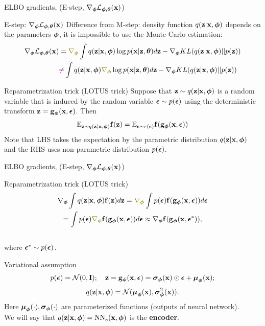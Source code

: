 \begin{frame}{ELBO gradients, (E-step, $\nabla_{\boldsymbol{\phi}} \mathcal{L}_{\boldsymbol{\phi}, \boldsymbol{\theta}}(\mathbf{x})$)}
	\begin{block}{E-step: $\nabla_{\boldsymbol{\phi}} \mathcal{L}_{\boldsymbol{\phi}, \boldsymbol{\theta}}(\mathbf{x})$}
		Difference from M-step: density function $q(\mathbf{z}| \mathbf{x}, \boldsymbol{\phi})$ depends on the parameters $\boldsymbol{\phi}$, it is impossible to use the Monte-Carlo estimation:
		\begin{align*}
			\nabla_{\bphi} \cL_{\bphi, \btheta}(\bx) &= {\color{olive}\nabla_{\bphi}} \int q(\bz | \bx, \bphi)\log p(\bx | \bz, \btheta) d \bz - \nabla_{\bphi} KL(q(\bz | \bx, \bphi) || p(\bz)) \\
			& {\color{violet}\neq} \int q(\bz | \bx, \bphi) {\color{olive}\nabla_{\bphi}} \log p(\bx | \bz, \btheta) d \bz - \nabla_{\bphi} KL(q(\bz | \bx, \bphi) || p(\bz))
		\end{align*}
	\end{block}
	\vspace{-0.5cm}
	\begin{block}{Reparametrization trick (LOTUS trick)} 
		Suppose that $\mathbf{z} \sim q(\mathbf{z} | \mathbf{x}, \boldsymbol{\phi})$ is a random variable that is induced by the random variable $\boldsymbol{\epsilon} \sim p(\boldsymbol{\epsilon})$ using the deterministic transform $\mathbf{z} = \mathbf{g}_{\boldsymbol{\phi}}(\mathbf{x}, \boldsymbol{\epsilon})$. Then
		\[
			\mathbb{E}_{\mathbf{z} \sim q(\mathbf{z} | \mathbf{x}, \boldsymbol{\phi})} \mathbf{f}(\mathbf{z}) = \mathbb{E}_{\boldsymbol{\epsilon} \sim r(\boldsymbol{\epsilon})} \mathbf{f}(\mathbf{g}_{\boldsymbol{\phi}}(\mathbf{x}, \boldsymbol{\epsilon}))
		\]
		Note that LHS takes the expectation by the parametric distribution $q(\mathbf{z} | \mathbf{x}, \boldsymbol{\phi})$ and the RHS uses non-parametric distribution $p(\boldsymbol{\epsilon})$.
	\end{block}
\end{frame}
\begin{frame}{ELBO gradients, (E-step, $\nabla_{\boldsymbol{\phi}} \mathcal{L}_{\boldsymbol{\phi}, \boldsymbol{\theta}}(\mathbf{x})$)}
	\begin{block}{Reparametrization trick (LOTUS trick)} 
		\vspace{-0.7cm}
		\begin{multline*}
			\nabla_{\bphi}\int q(\bz|\bx, \bphi) \bff(\bz) d\bz = {\color{olive}\nabla_{\bphi}} \int p(\bepsilon)  \bff(\bg_{\bphi}(\bx, \bepsilon)) d\bepsilon  \\ = \int p(\bepsilon) {\color{olive}\nabla_{\bphi}} \bff(\bg_{\bphi}(\bx, \bepsilon)) d\bepsilon \approx \nabla_{\bphi} \bff(\bg_{\bphi}(\bx, \bepsilon^*)),
		\end{multline*}
		\vspace{-0.5cm} \\
		where $\boldsymbol{\epsilon}^* \sim p(\boldsymbol{\epsilon})$.

	\end{block}
	\begin{block}{Variational assumption} 
		\vspace{-0.3cm}
		\[
			p(\boldsymbol{\epsilon}) = \mathcal{N}(0, \mathbf{I}); \quad \mathbf{z} = \mathbf{g}_{\boldsymbol{\phi}}(\mathbf{x}, \boldsymbol{\epsilon}) = \boldsymbol{\sigma}_{\boldsymbol{\phi}}(\mathbf{x}) \odot \boldsymbol{\epsilon} + \boldsymbol{\mu}_{\boldsymbol{\phi}}(\mathbf{x});
		\]
		\[
			q(\mathbf{z}| \mathbf{x}, \boldsymbol{\phi}) = \mathcal{N} (\boldsymbol{\mu}_{\boldsymbol{\phi}}(\mathbf{x}), \boldsymbol{\sigma}^2_{\boldsymbol{\phi}}(\mathbf{x})).
		\]
		Here $\boldsymbol{\mu}_{\boldsymbol{\phi}}(\cdot), \boldsymbol{\sigma}_{\boldsymbol{\phi}}(\cdot)$ are parameterized functions (outputs of neural network). \\
		We will say that $q(\mathbf{z}| \mathbf{x}, \boldsymbol{\phi}) = \text{NN}_e(\mathbf{x}, \boldsymbol{\phi})$ is the \textbf{encoder}.
	\end{block}
\end{frame}
